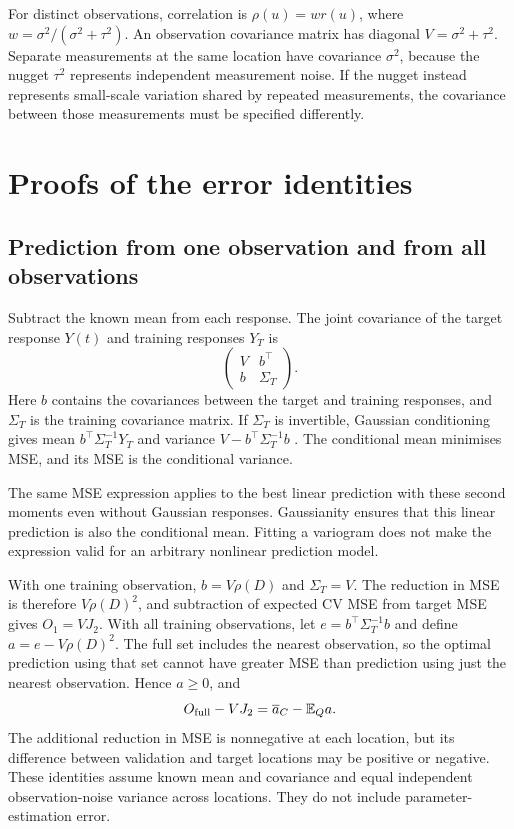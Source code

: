 \documentclass[11pt,a4paper]{article}
\newcommand{\E}{\mathbb{E}}
\begin{document}
For distinct observations, correlation is $\rho(u)=wr(u)$, where $w=\sigma^2/(\sigma^2+\tau^2)$. An observation covariance matrix has diagonal $V=\sigma^2+\tau^2$. Separate measurements at the same location have covariance $\sigma^2$, because the nugget $\tau^2$ represents independent measurement noise. If the nugget instead represents small-scale variation shared by repeated measurements, the covariance between those measurements must be specified differently.

\section{Proofs of the error identities}
\label{sec:identities}
\subsection{Prediction from one observation and from all observations}
\label{sec:prediction}
Subtract the known mean from each response. The joint covariance of the target response $Y(t)$ and training responses $Y_T$ is
\[
\begin{pmatrix}V&b^\top\\b&\Sigma_T\end{pmatrix}.
\]
Here $b$ contains the covariances between the target and training responses, and $\Sigma_T$ is the training covariance matrix. If $\Sigma_T$ is invertible, Gaussian conditioning gives mean $b^\top\Sigma_T^{-1}Y_T$ and variance $V-b^\top\Sigma_T^{-1}b$ \citep{rasmussen2006gpml}. The conditional mean minimises MSE, and its MSE is the conditional variance.

The same MSE expression applies to the best linear prediction with these second moments even without Gaussian responses. Gaussianity ensures that this linear prediction is also the conditional mean. Fitting a variogram does not make the expression valid for an arbitrary nonlinear prediction model.

With one training observation, $b=V\rho(D)$ and $\Sigma_T=V$. The reduction in MSE is therefore $V\rho(D)^2$, and subtraction of expected CV MSE from target MSE gives $O_1=VJ_2$. With all training observations, let $e=b^\top\Sigma_T^{-1}b$ and define $a=e-V\rho(D)^2$. The full set includes the nearest observation, so the optimal prediction using that set cannot have greater MSE than prediction using just the nearest observation. Hence $a\geq0$, and
\[
O_{\rm full}-VJ_2=\overline a_C-\E_Qa.
\]
The additional reduction in MSE is nonnegative at each location, but its difference between validation and target locations may be positive or negative. These identities assume known mean and covariance and equal independent observation-noise variance across locations. They do not include parameter-estimation error.
\end{document}
